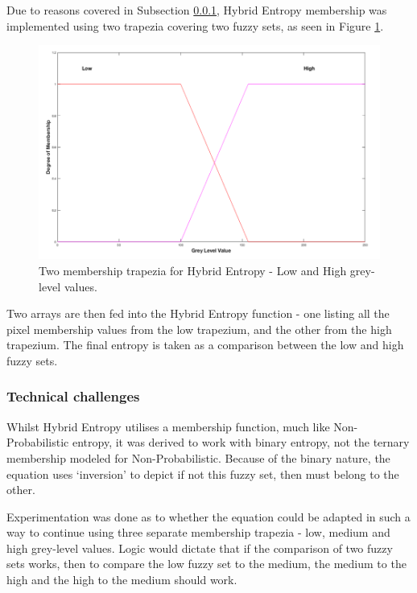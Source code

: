 Due to reasons covered in Subsection \ref{sssec:hyrid-technical}, Hybrid Entropy membership was implemented using two trapezia covering two fuzzy sets, as seen in Figure \ref{fig:2-traps}.

\begin{figure}[H]
  \center
  \includegraphics[scale=0.4]{Chapter2/hybrid-img/2_traps.png}
  \caption{Two membership trapezia for Hybrid Entropy - Low and High grey-level values.}
  \label{fig:2-traps}
\end{figure}

Two arrays are then fed into the Hybrid Entropy function - one listing all the pixel membership values from the low trapezium, and the other from the high trapezium. The final entropy is taken as a comparison between the low and high fuzzy sets.

\subsubsection{Technical challenges}
\label{sssec:hyrid-technical}

Whilst Hybrid Entropy utilises a membership function, much like Non-Probabilistic entropy, it was derived to work with binary entropy, not the ternary membership modeled for Non-Probabilistic. Because of the binary nature, the equation uses `inversion' to depict if not this fuzzy set, then must belong to the other.

Experimentation was done as to whether the equation could be adapted in such a way to continue using three separate membership trapezia - low, medium and high grey-level values. Logic would dictate that if the comparison of two fuzzy sets works, then to compare the low fuzzy set to the medium, the medium to the high and the high to the medium should work.

